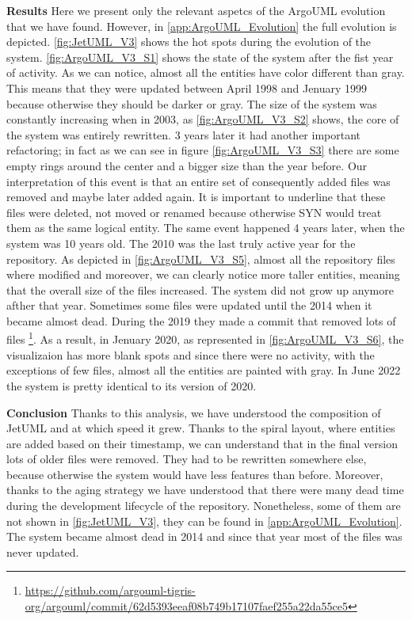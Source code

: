 \textbf{Results}
Here we present only the relevant aspetcs of the ArgoUML evolution that we have found. However, in \autoref{app:ArgoUML_Evolution} the full evolution is depicted. \autoref{fig:JetUML_V3} shows the hot spots during the evolution of the system. \autoref{fig:ArgoUML_V3_S1} shows the state of the system after the fist year of activity. As we can notice, almost all the entities have color different than gray. This means that they were updated between April 1998 and Jenuary 1999 because otherwise they should be darker or gray. The size of the system was constantly increasing when in 2003, as \autoref{fig:ArgoUML_V3_S2} shows, the core of the system was entirely rewritten. 3 years later it had another important refactoring; in fact as we can see in figure \autoref{fig:ArgoUML_V3_S3} there are some empty rings around the center and a bigger size than the year before. Our interpretation of this event is that an entire set of consequently added files was removed and maybe later added again. It is important to underline that these files were deleted, not moved or renamed because otherwise SYN would treat them as the same logical entity. The same event happened 4 years later, when the system was 10 years old. The 2010 was the last truly active year for the repository. As depicted in \autoref{fig:ArgoUML_V3_S5}, almost all the repository files where modified and moreover, we can clearly notice more taller entities, meaning that the overall size of the files increased. The system did not grow up anymore afther that year. Sometimes some files were updated until the 2014 when it became almost dead. During the 2019 they made a commit that removed lots of files \footnote{\url{https://github.com/argouml-tigris-org/argouml/commit/62d5393eeaf08b749b17107faef255a22da55ce5}}. As a result, in Jenuary 2020, as represented in \autoref{fig:ArgoUML_V3_S6}, the visualizaion has more blank spots and since there were no activity, with the exceptions of few files, almost all the entities are painted with gray. In June 2022 the system is pretty identical to its version of 2020. 

\bigbreak
\textbf{Conclusion}
Thanks to this analysis, we have understood the composition of JetUML and at which speed it grew. Thanks to the spiral layout, where entities are added based on their timestamp, we can understand that in the final version lots of older files were removed. They had to be rewritten somewhere else, because otherwise the system would have less features than before. Moreover, thanks to the aging strategy we have understood that there were many dead time during the development lifecycle of the repository. Nonetheless, some of them are not shown in \autoref{fig:JetUML_V3}, they can be found in \autoref{app:ArgoUML_Evolution}. The system became almost dead in 2014 and since that year most of the files was never updated. 



